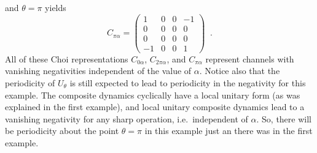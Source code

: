 and $\theta=\pi$ yields
$$
C_{\pi\alpha} = \begin{pmatrix}
 1&0&0&-1\\
 0&0&0&0\\
 0&0&0&0\\
 -1&0&0&1
\end{pmatrix}\;\;.
$$ 
All of these Choi representations $C_{0\alpha}$, $C_{2\pi\alpha}$, and $C_{\pi\alpha}$ represent channels with vanishing negativities independent of the value of $\alpha$.  Notice also that the periodicity of $U_\theta$ is still expected to lead to periodicity in the negativity for this example.  The composite dynamics cyclically have a local unitary form (as was explained in the first example), and local unitary composite dynamics lead to a vanishing negativity for any sharp operation, i.e.\ independent of $\alpha$.  So, there will be periodicity about the point $\theta=\pi$ in this example just an there was in the first example.

